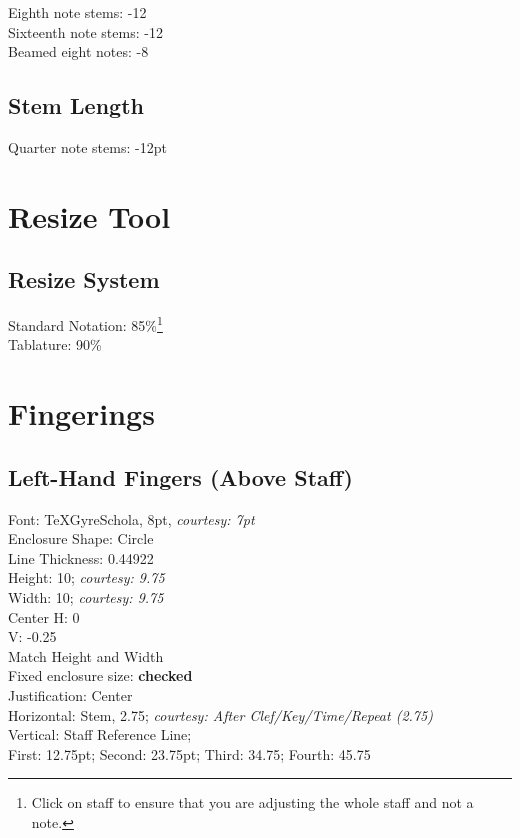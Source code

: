 \documentclass[]{memoir}
\begin{document}
Eighth note stems: -12\\
Sixteenth note stems: -12\\
Beamed eight notes: -8

\section{Stem Length}
\label{sec:stem-length}

Quarter note stems: -12pt

\chapter{Resize Tool}
\label{sec:resize-tool}

\section{Resize System}
\label{sec:resize-system}

Standard Notation: 85\%\footnote{Click on staff to ensure that you are adjusting the whole staff and not a note.}\\

\noindent Tablature: 90\%

\chapter{Fingerings}
\label{sec:fingerings}

\section{Left-Hand Fingers (Above Staff)}
\label{sec:left-hand-fingers}

Font: TeXGyreSchola, 8pt, \emph{courtesy: 7pt}\\
Enclosure Shape: Circle\\
Line Thickness: 0.44922\\
Height: 10; \emph{courtesy: 9.75}\\
Width: 10; \emph{courtesy: 9.75}\\
Center H: 0\\
V: -0.25\\
Match Height and Width\\
Fixed enclosure size: \textbf{checked}\\
Justification: Center\\
Horizontal: Stem, 2.75; \emph{courtesy: After Clef/Key/Time/Repeat (2.75)}\\
Vertical: Staff Reference Line;\\
First: 12.75pt; Second: 23.75pt; Third: 34.75; Fourth: 45.75
\end{document}
